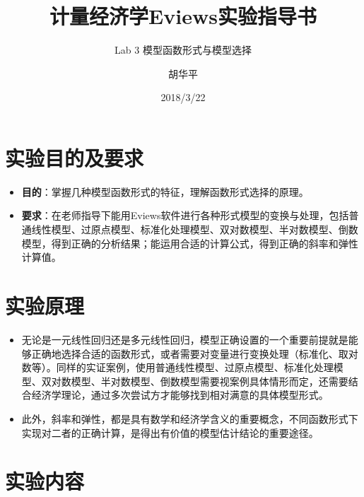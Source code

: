 \documentclass[12pt,(landscape,a4paper),(portrait,a4paper)]{article}
\title{计量经济学Eviews实验指导书}
\subtitle{Lab 3 模型函数形式与模型选择}
\author{胡华平}
\date{2018/3/22}
\makeatletter
\def\maxwidth{\ifdim\Gin@nat@width>\linewidth\linewidth\else\Gin@nat@width\fi}
\providecommand{\tightlist}{%
  \setlength{\itemsep}{0pt}\setlength{\parskip}{0pt}}
\let\stdsection\section
\renewcommand\section{\newpage\stdsection}
\makeatother
\begin{document}
\maketitle

\renewcommand{\figurename}{图}
\renewcommand{\contentsname}{目录}
\renewcommand{\tablename}{表}

\makeatletter
\def\maxwidth{ %
  \ifdim\Gin@nat@width>\linewidth
    \linewidth
  \else
    \Gin@nat@width
  \fi
}
\makeatother

{
\setcounter{tocdepth}{3}
\tableofcontents
}
\section{实验目的及要求}

\begin{itemize}
\tightlist
\item
  \textbf{目的}：掌握几种模型函数形式的特征，理解函数形式选择的原理。
\item
  \textbf{要求}：在老师指导下能用Eviews软件进行各种形式模型的变换与处理，包括普通线性模型、过原点模型、标准化处理模型、双对数模型、半对数模型、倒数模型，得到正确的分析结果；能运用合适的计算公式，得到正确的斜率和弹性计算值。
\end{itemize}

\section{实验原理}

\begin{itemize}
\tightlist
\item
  无论是一元线性回归还是多元线性回归，模型正确设置的一个重要前提就是能够正确地选择合适的函数形式，或者需要对变量进行变换处理（标准化、取对数等）。同样的实证案例，使用普通线性模型、过原点模型、标准化处理模型、双对数模型、半对数模型、倒数模型需要视案例具体情形而定，还需要结合经济学理论，通过多次尝试方才能够找到相对满意的具体模型形式。
\item
  此外，斜率和弹性，都是具有数学和经济学含义的重要概念，不同函数形式下实现对二者的正确计算，是得出有价值的模型估计结论的重要途径。
\end{itemize}

\section{实验内容}
\end{document}
